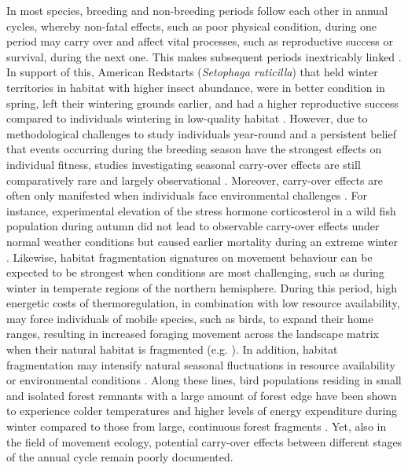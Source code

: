 \documentclass[10pt, twoside]{book} %
\begin{document}
In most species, breeding and non-breeding periods follow each other in annual cycles, whereby non-fatal effects, such as poor physical condition, during one period may carry over and affect vital processes, such as reproductive success or survival, during the next one. This makes subsequent periods inextricably linked \citep{Harrison2011, Marra2015}. In support of this, American Redstarts (\textit{Setophaga ruticilla}) that held winter territories in habitat with higher insect abundance, were in better condition in spring, left their wintering grounds earlier, and had a higher reproductive success compared to individuals wintering in low-quality habitat \citep{Norris2004, Studds2005, Reudink2009}. However, due to methodological challenges to study individuals year-round and a persistent belief that events occurring during the breeding season have the strongest effects on individual fitness, studies investigating seasonal carry-over effects are still comparatively rare and largely observational \citep{OConnor2014, Marra2015}. Moreover, carry-over effects are often only manifested when individuals face environmental challenges \citep{OConnor2015}. For instance, experimental elevation of the stress hormone corticosterol in a wild fish population during autumn did not lead to observable carry-over effects under normal weather conditions but caused earlier mortality during an extreme winter \citep{OConnor2010}. Likewise, habitat fragmentation signatures on movement behaviour can be expected to be strongest when conditions are most challenging, such as during winter in temperate regions of the northern hemisphere. During this period, high energetic costs of thermoregulation, in combination with low resource availability, may force individuals of mobile species, such as birds, to expand their home ranges, resulting in increased foraging movement across the landscape matrix when their natural habitat is fragmented (e.g. \citealt{Wiktander2001}). In addition, habitat fragmentation may intensify natural seasonal fluctuations in resource availability or environmental conditions \citep{Ewers2013}. Along these lines, bird populations residing in small and isolated forest remnants with a large amount of forest edge have been shown to experience colder temperatures and higher levels of energy expenditure during winter compared to those from large, continuous forest fragments \citep{Latimer2017}. Yet, also in the field of movement ecology, potential carry-over effects between different stages of the annual cycle remain poorly documented.\\
\end{document}
